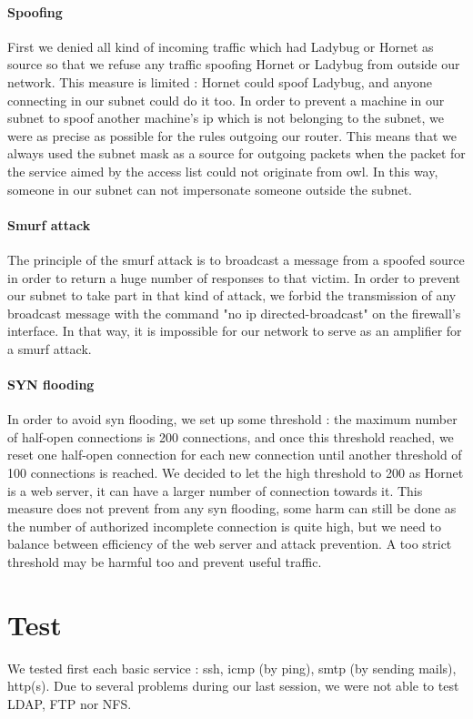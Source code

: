 \documentclass[a4paper,titlepage]{article}
\begin{document}
\paragraph{Spoofing}
First we denied all kind of incoming traffic which had Ladybug or Hornet as source so that we refuse any traffic spoofing Hornet or Ladybug from outside our network. This measure is limited : Hornet could spoof Ladybug, and anyone connecting in our subnet could do it too. In order to  prevent a machine in our subnet to spoof another machine's ip which is not belonging to the subnet, we were as precise as possible for the rules outgoing our router. This means that we always used the subnet mask as a source for outgoing packets when the packet for the service aimed by the access list could not originate from owl.  In this way, someone in our subnet can not impersonate someone outside the subnet.

\paragraph{Smurf attack}
The principle of the smurf attack is to broadcast a message from a spoofed source in order to return a huge number of responses to that victim.
In order to prevent our subnet to take part in that kind of attack, we forbid the transmission of any broadcast message with the command "no ip directed-broadcast" on the firewall's interface. In that way, it is impossible for our network to serve as an amplifier for a smurf attack.

\paragraph{SYN flooding}
In order to avoid syn flooding, we set up some threshold : the maximum number of half-open connections is 200 connections, and once this threshold reached, we reset one half-open connection for each new connection until another threshold of 100 connections is reached. We decided to let the high threshold to 200 as Hornet is a web server, it can have a larger number of connection towards it. This measure does not prevent from any syn flooding, some harm can still be done as the number of authorized incomplete connection is quite high, but we need to balance between efficiency of the web server and attack prevention. A too strict threshold may be harmful too and prevent useful traffic.

\section{Test}
We tested first each basic service : ssh, icmp (by ping), smtp (by sending mails), http(s). Due to several problems during our last session, we were not able to test LDAP, FTP nor NFS.
\end{document}
